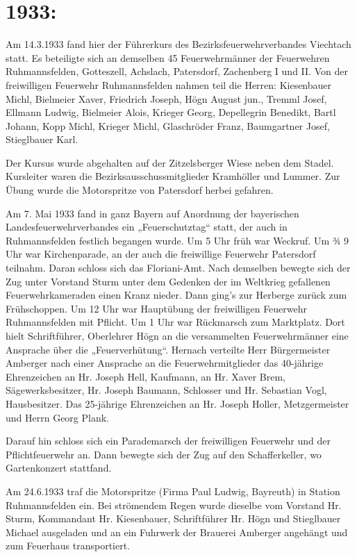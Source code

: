 \documentclass[12pt,a4paper]{book}
\begin{document}
\section{1933:}

Am 14.3.1933 fand hier der Führerkurs des Bezirksfeuerwehrverbandes Viechtach
statt. Es beteiligte sich an demselben 45 Feuerwehrmänner der Feuerwehren
Ruhmannsfelden, Gotteszell, Achslach, Patersdorf, Zachenberg I und II. Von der
freiwilligen Feuerwehr Ruhmannsfelden nahmen teil die Herren: Kiesenbauer Michl,
Bielmeier Xaver, Friedrich Joseph, Högn August jun., Tremml Josef, Ellmann
Ludwig, Bielmeier Alois, Krieger Georg, Depellegrin Benedikt, Bartl Johann, Kopp
Michl, Krieger Michl, Glaschröder Franz, Baumgartner Josef, Stieglbauer Karl.

    Der Kursus wurde abgehalten auf der Zitzelsberger Wiese neben dem Stadel.
    Kursleiter waren die Bezirksausschussmitglieder Kramhöller und Lummer. Zur
    Übung wurde die Motorspritze von Patersdorf herbei gefahren.

Am 7. Mai 1933 fand in ganz Bayern auf Anordnung der bayerischen
Landesfeuerwehrverbandes ein „Feuerschutztag“ statt, der auch in Ruhmannsfelden
festlich begangen wurde. Um 5 Uhr früh war Weckruf. Um ¾ 9 Uhr war
Kirchenparade, an der auch die freiwillige Feuerwehr Patersdorf teilnahm. Daran
schloss sich das Floriani-Amt. Nach demselben bewegte sich der Zug unter
Vorstand Sturm unter dem Gedenken der im Weltkrieg gefallenen Feuerwehrkameraden
einen Kranz nieder. Dann ging’s zur Herberge zurück zum Frühschoppen. Um 12 Uhr
war Hauptübung der freiwilligen Feuerwehr Ruhmannsfelden mit Pflicht. Um 1 Uhr
war Rückmarsch zum Marktplatz. Dort hielt Schriftführer, Oberlehrer Högn an die
versammelten Feuerwehrmänner eine Ansprache über die „Feuerverhütung“. Hernach
verteilte Herr Bürgermeister Amberger nach einer Ansprache an die
Feuerwehrmitglieder das 40-jährige Ehrenzeichen an Hr. Joseph Hell, Kaufmann, an
Hr. Xaver Brem, Sägewerksbesitzer, Hr. Joseph Baumann, Schlosser und Hr.
Sebastian Vogl, Hausbesitzer. Das 25-jährige Ehrenzeichen an Hr. Joseph Holler,
Metzgermeister und Herrn Georg Plank.

Darauf hin schloss sich ein Parademarsch der freiwilligen Feuerwehr und der
Pflichtfeuerwehr an. Dann bewegte sich der Zug auf den Schafferkeller, wo
Gartenkonzert stattfand.

Am 24.6.1933 traf die Motorspritze (Firma Paul Ludwig, Bayreuth) in Station
Ruhmannsfelden ein. Bei strömendem Regen wurde dieselbe vom Vorstand Hr. Sturm,
Kommandant Hr. Kiesenbauer, Schriftführer Hr. Högn und Stieglbauer Michael
ausgeladen und an ein Fuhrwerk der Brauerei Amberger angehängt und zum Feuerhaus
transportiert.
\end{document}

